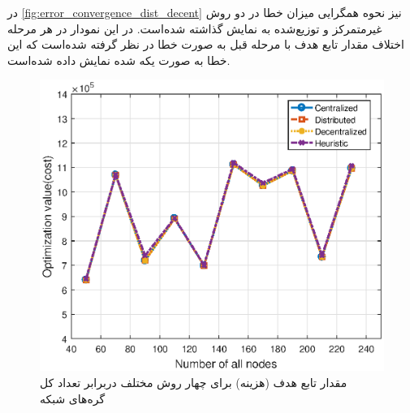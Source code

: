 	در \cref{fig:error_convergence_dist_decent} نیز نحوه همگرایی میزان خطا در دو روش غیرمتمرکز و توزیع‌شده به نمایش گذاشته شده‌است. در این نمودار در هر مرحله اختلاف مقدار تابع هدف با مرحله قبل به صورت خطا در نظر گرفته شده‌است که این خطا به صورت یکه شده نمایش داده شده‌است. 

\begin{figure}[h!]
	\centerline{\includegraphics[width=12cm]{graphics/4-heuristic-dist/optimization_value_per_number_of_nodes_all_solutions}}
	\caption{مقدار تابع هدف (هزینه) برای چهار روش مختلف دربرابر تعداد کل گره‌های شبکه}
	\label{fig:optimization_value_per_number_of_nodes_all_solutions}
\end{figure}

